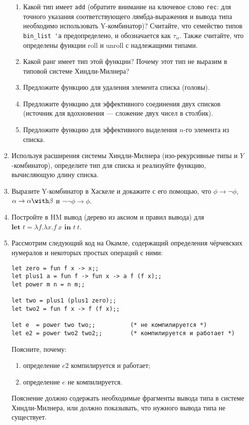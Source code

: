 \documentclass[10pt,a4paper,oneside]{article}
\begin{document}
\begin{enumerate}
\begin{enumerate}
\item Какой тип имеет \verb!add! (обратите внимание на ключевое слово \verb!rec!: для 
точного указания соответствующего лямбда-выражения и вывода типа необходимо использовать Y-комбинатор)?
Считайте, что семейство типов \verb!bin_list 'a! предопределено, и обозначается как $\tau_\alpha$.
Также считайте, что определены функции roll и unroll с надлежащими типами.
\item Какой ранг имеет тип этой функции? Почему этот тип не выразим в типовой системе Хиндли-Милнера?
\item Предложите функцию для удаления элемента списка (головы).
\item Предложите функцию для эффективного соединения двух списков (источник для 
вдохновения --- сложение двух чисел в столбик).
\item Предложите функцию для эффективного выделения $n$-го элемента из списка.
\end{enumerate}

\item Используя расширения системы Хиндли-Милнера (изо-рекурсивные типы и $Y$-комбинатор), 
определите тип для списка и реализуйте функцию, вычисляющую длину списка.

\item Выразите Y-комбинатор в Хаскеле и докажите с его помощью, что $\phi\rightarrow\neg\phi$,
$\alpha\rightarrow\alpha\with\beta$ и $\neg\neg\phi\rightarrow\phi$.

\item Постройте в HM вывод (дерево из аксиом и правил вывода) для
$\textbf{let }t = \lambda f.\lambda x.f\ x \textbf{ in }t\ t$.

\item Рассмотрим следующий код на Окамле, содержащий определения чёрчевских нумералов
и некоторых простых операций с ними:

\begin{verbatim}
let zero = fun f x -> x;;
let plus1 a = fun f -> fun x -> a f (f x);;
let power m n = n m;;

let two = plus1 (plus1 zero);;
let two2 = fun f x -> f (f x);;

let e  = power two two;;          (* не компилируется *)
let e2 = power two2 two2;;        (* компилируется и работает *)
\end{verbatim}

Поясните, почему:
\begin{enumerate}
\item определение $e2$ компилируется и работает;
\item определение $e$ не компилируется.
\end{enumerate}

Пояснение должно содержать необходимые фрагменты вывода типа в системе Хиндли-Милнера, 
или должно показывать, что нужного вывода типа не существует.
\end{enumerate}
\end{document}
